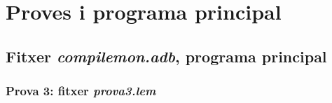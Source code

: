 \section{Proves i programa principal}

\subsection{Fitxer \emph{compilemon.adb}, programa principal}

\newpage

%

%

%

\subsubsection{Prova 3: fitxer \emph{prova3.lem}}

\newpage
